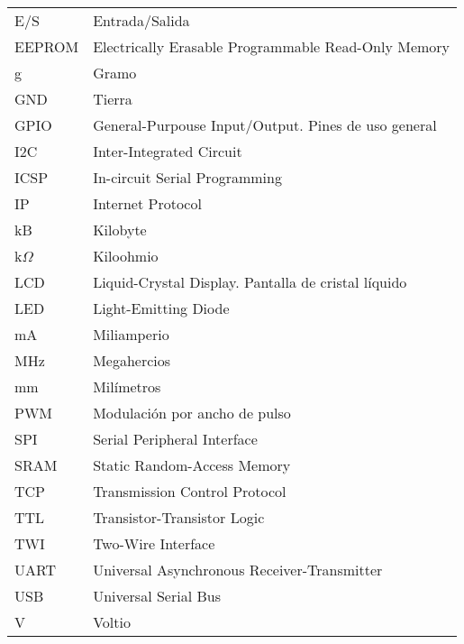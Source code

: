 \begin{longtable}{p{3cm}p{8.5cm}}
E/S & Entrada/Salida \\
EEPROM & Electrically Erasable Programmable Read-Only Memory\\
g & Gramo \\
GND & Tierra \\
GPIO & General-Purpouse Input/Output. Pines de uso general \\
I2C & Inter-Integrated Circuit \\
ICSP & In-circuit Serial Programming \\
IP & Internet Protocol \\
kB & Kilobyte \\
k$\Omega$ & Kiloohmio \\
LCD & Liquid-Crystal Display. Pantalla de cristal líquido \\
LED & Light-Emitting Diode \\
mA & Miliamperio \\
MHz & Megahercios \\
mm & Milímetros \\
PWM & Modulación por ancho de pulso \\
SPI & Serial Peripheral Interface \\
SRAM & Static Random-Access Memory \\
TCP & Transmission Control Protocol \\
TTL & Transistor-Transistor Logic\\
TWI & Two-Wire Interface \\
UART & Universal Asynchronous Receiver-Transmitter \\
USB & Universal Serial Bus \\
V & Voltio \\




\end{longtable}
